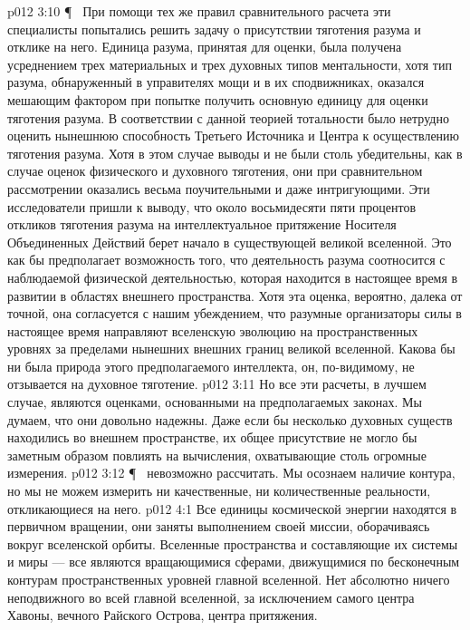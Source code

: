 \vs p012 3:10 \P\ \bibnobreakspace {} При помощи тех же правил сравнительного расчета эти специалисты попытались решить задачу о присутствии тяготения разума и отклике на него. Единица разума, принятая для оценки, была получена усреднением трех материальных и трех духовных типов ментальности, хотя тип разума, обнаруженный в управителях мощи и в их сподвижниках, оказался мешающим фактором при попытке получить основную единицу для оценки тяготения разума. В соответствии с данной теорией тотальности было нетрудно оценить нынешнюю способность Третьего Источника и Центра к осуществлению тяготения разума. Хотя в этом случае выводы и не были столь убедительны, как в случае оценок физического и духовного тяготения, они при сравнительном рассмотрении оказались весьма поучительными и даже интригующими. Эти исследователи пришли к выводу, что около восьмидесяти пяти процентов откликов тяготения разума на интеллектуальное притяжение Носителя Объединенных Действий берет начало в существующей великой вселенной. Это как бы предполагает возможность того, что деятельность разума соотносится с наблюдаемой физической деятельностью, которая находится в настоящее время в развитии в областях внешнего пространства. Хотя эта оценка, вероятно, далека от точной, она согласуется с нашим убеждением, что разумные организаторы силы в настоящее время направляют вселенскую эволюцию на пространственных уровнях за пределами нынешних внешних границ великой вселенной. Какова бы ни была природа этого предполагаемого интеллекта, он, по\hyp{}видимому, не отзывается на духовное тяготение.
\vs p012 3:11 Но все эти расчеты, в лучшем случае, являются оценками, основанными на предполагаемых законах. Мы думаем, что они довольно надежны. Даже если бы несколько духовных существ находились во внешнем пространстве, их общее присутствие не могло бы заметным образом повлиять на вычисления, охватывающие столь огромные измерения.
\vs p012 3:12 \P\  невозможно рассчитать. Мы осознаем наличие контура, но мы не можем измерить ни качественные, ни количественные реальности, откликающиеся на него.
\vs p012 4:1 Все единицы космической энергии находятся в первичном вращении, они заняты выполнением своей миссии, оборачиваясь вокруг вселенской орбиты. Вселенные пространства и составляющие их системы и миры --- все являются вращающимися сферами, движущимися по бесконечным контурам пространственных уровней главной вселенной. Нет абсолютно ничего неподвижного во всей главной вселенной, за исключением самого центра Хавоны, вечного Райского Острова, центра притяжения.
